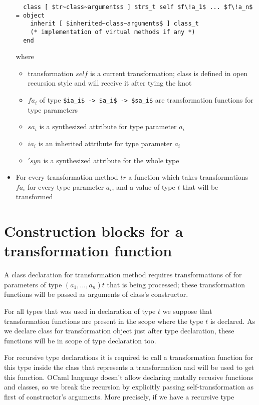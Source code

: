 \documentclass[acmsmall,review,anonymous]{acmart}\settopmatter{printfolios=true,printccs=false,printacmref=false}
\begin{document}
\begin{itemize}
  \begin{lstlisting}
  class [ $tr~class~arguments$ ] $tr$_t self $f\!a_1$ ... $f\!a_n$ = object
    inherit [ $inherited~class~arguments$ ] class_t
    (* implementation of virtual methods if any *)
  end
  \end{lstlisting}
  where \begin{itemize}
          \item transformation $self$ is a current transformation; class is defined in open recursion style and will receive it after tying the knot
          \item $f\!a_i$ of type \lstinline{$ia_i$ -> $a_i$ -> $sa_i$} are transformation functions for type parameters
          \item $sa_i$ is a synthesized attribute for type parameter $a_i$
          \item $ia_i$ is an inherited attribute for type parameter $a_i$
          \item $'syn$ is a synthesized attribute for the whole type
  \end{itemize}
  \item For every transformation method $tr$ a function which takes transformations $f\!a_i$ for every type parameter $a_i$, and a value of type $t$ that will be transformed
\end{itemize}

\section{Construction blocks for a transformation function}
A class declaration for transformation method requires transformations of for parameters of type $(a_1,...,a_n) t$ that is being processed; these transformation functions will be passed as arguments of class's constructor.

For all types that was used in declaration of type $t$ we suppose that transformation functions are present in the scope where the type $t$ is declared. As we declare class for transformation object just after type declaration, these functions will be in scope of type declaration too.

For recursive type declarations it is required to call a transformation function for this type inside the class that represents a transformation and will be used to get this function. OCaml language doesn't allow declaring mutally recusive functions and classes, so we break the recursion by explicitly passing self-transformation as first of constructor's arguments. More precisely, if we have a recursive type 
\end{document}
